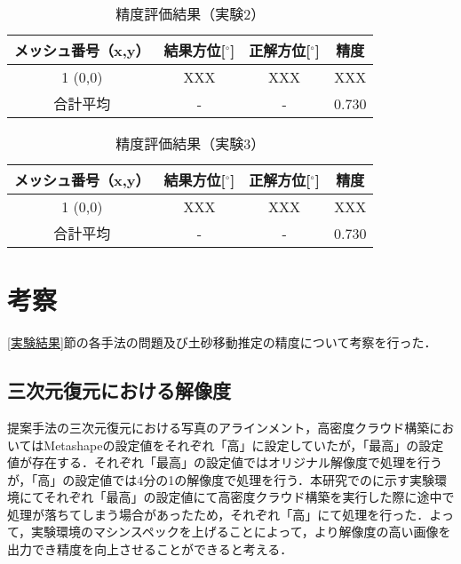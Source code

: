     \begin{table}[tbp]
      \centering
      \caption{精度評価結果（実験2）}
      \begin{tabular}{cccc}
        \hline
        \textbf{メッシュ番号（x,y）} & \textbf{結果方位[$^{\circ}$]} & \textbf{正解方位[$^{\circ}$]} & \textbf{精度} \\
        \hline  \hline
        1  (0,0)  & XXX & XXX & XXX \\
        合計平均 & - & - & 0.730 \\
        \hline
      \end{tabular}
    \end{table}

    \begin{table}[tbp]
      \centering
      \caption{精度評価結果（実験3）}
      \label{精度評価結果（実験3）}
      \begin{tabular}{cccc}
        \hline
        \textbf{メッシュ番号（x,y）} & \textbf{結果方位[$^{\circ}$]} & \textbf{正解方位[$^{\circ}$]} & \textbf{精度} \\
        \hline  \hline
        1  (0,0)  & XXX & XXX & XXX \\
        合計平均 & - & - & 0.730 \\
        \hline
      \end{tabular}
    \end{table}



  \section{考察}
    \label{考察}
    \ref{実験結果}節の各手法の問題及び土砂移動推定の精度について考察を行った．


    \subsection*{三次元復元における解像度}
      提案手法の三次元復元における写真のアラインメント，高密度クラウド構築においてはMetashapeの設定値をそれぞれ「高」に設定していたが，「最高」の設定値が存在する．それぞれ「最高」の設定値ではオリジナル解像度で処理を行うが，「高」の設定値では4分の1の解像度で処理を行う．本研究でのに示す実験環境にてそれぞれ「最高」の設定値にて高密度クラウド構築を実行した際に途中で処理が落ちてしまう場合があったため，それぞれ「高」にて処理を行った．よって，実験環境のマシンスペックを上げることによって，より解像度の高い画像を出力でき精度を向上させることができると考える．


